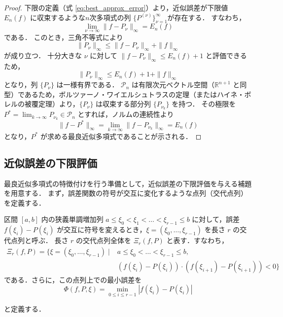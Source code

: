     \begin{proof}
      下限の定義（式 \ref{eq:best_approx_error}）より，近似誤差が下限値 $E_n(f)$ に収束するような$n$次多項式の列 $\{P^{(\nu)}\}_{\nu=1}^\infty$が存在する． すなわち，
      \[ \lim_{\nu \to \infty} \| f - P_\nu \|_\infty = E_n(f) \]
      である． このとき，三角不等式により
      \begin{equation}
        \| P_\nu \|_\infty \le \| f - P_\nu \|_\infty + \| f \|_\infty
      \end{equation}
      が成り立つ． 十分大きな $\nu$ に対して $\| f - P_\nu \|_\infty \le E_n(f) + 1$ と評価できるため，
      \[ \| P_\nu \|_\infty \le E_n(f) + 1 + \| f \|_\infty \]
      となり，列 $\{P_\nu\}$ は一様有界である．
      $\mathcal{P}_n$ は有限次元ベクトル空間（$\mathbb{R}^{n+1}$ と同型）であるため，ボルツァーノ・ワイエルシュトラスの定理（またはハイネ・ボレルの被覆定理）より，$\{P_\nu\}$ は収束する部分列 $\{P_{\nu_k}\}$ を持つ．
      その極限を $P^* = \lim_{k \to \infty} P_{\nu_k} \in \mathcal{P}_n$ とすれば，ノルムの連続性より
      \begin{equation}
        \| f - P^* \|_\infty = \lim_{k \to \infty} \| f - P_{\nu_k} \|_\infty = E_n(f)
      \end{equation}
      となり，$P^*$ が求める最良近似多項式であることが示される．
    \end{proof}

  \subsection{近似誤差の下限評価}
    \label{subsec:lower_bound_error}
    最良近似多項式の特徴付けを行う準備として，近似誤差の下限評価を与える補題を用意する．
    まず，誤差関数の符号が交互に変化するような点列（交代点列）を定義する．
    \begin{definition}[交代点列]
    \label{def:alternation_points}
      
      区間 $[a, b]$ 内の狭義単調増加列 $a \le \xi_0 < \xi_1 < \dots < \xi_{r-1} \le b$ に対して，誤差 $f(\xi_i) - P(\xi_i)$ が交互に符号を変えるとき，$\xi = (\xi_0, \dots, \xi_{r-1})$ を長さ $r$ の交代点列と呼ぶ．
      長さ $r$ の交代点列全体を $\Xi_r(f, P)$ と表す．すなわち，
      \begin{equation}
        \begin{split}
          \Xi_r(f, P) = \{ \xi = (\xi_0, \dots, \xi_{r-1}) \mid & a \le \xi_0 < \dots < \xi_{r-1} \le b, \ \\
          & (f(\xi_i) - P(\xi_i)) \cdot (f(\xi_{i+1}) - P(\xi_{i+1})) < 0 \}
        \end{split}
      \end{equation}
      である．さらに，この点列上での最小誤差を
      \begin{equation}
        \Phi(f, P, \xi) = \min_{0 \le i \le r-1} |f(\xi_i) - P(\xi_i)|
      \end{equation}
    \end{definition}
    \noindent
    と定義する．
    
